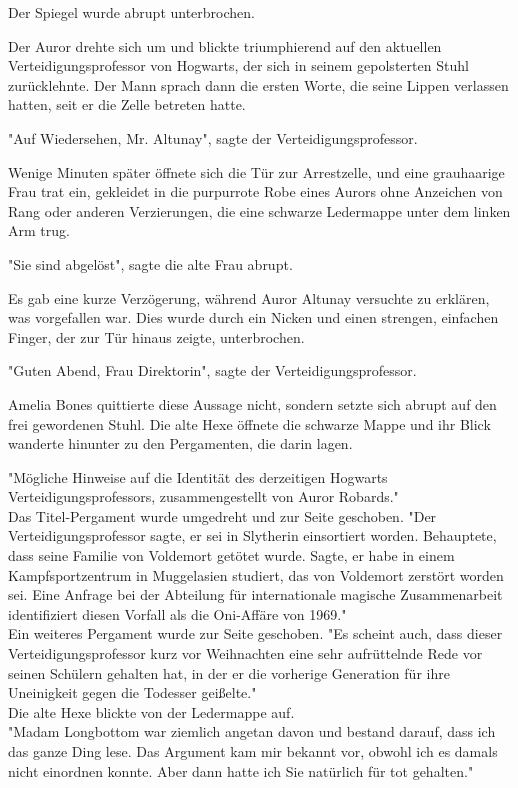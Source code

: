 {Der Spiegel wurde abrupt unterbrochen.

Der Auror drehte sich um und blickte triumphierend auf den aktuellen Verteidigungsprofessor von Hogwarts, der sich in seinem gepolsterten Stuhl zurücklehnte. Der Mann sprach dann die ersten Worte, die seine Lippen verlassen hatten, seit er die Zelle betreten hatte.

"Auf Wiedersehen, Mr. Altunay", sagte der Verteidigungsprofessor.

Wenige Minuten später öffnete sich die Tür zur Arrestzelle, und eine grauhaarige Frau trat ein, gekleidet in die purpurrote Robe eines Aurors ohne Anzeichen von Rang oder anderen Verzierungen, die eine schwarze Ledermappe unter dem linken Arm trug.

"Sie sind abgelöst", sagte die alte Frau abrupt.

Es gab eine kurze Verzögerung, während Auror Altunay versuchte zu erklären, was vorgefallen war. Dies wurde durch ein Nicken und einen strengen, einfachen Finger, der zur Tür hinaus zeigte, unterbrochen.

"Guten Abend, Frau Direktorin", sagte der Verteidigungsprofessor.

Amelia Bones quittierte diese Aussage nicht, sondern setzte sich abrupt auf den frei gewordenen Stuhl. Die alte Hexe öffnete die schwarze Mappe und ihr Blick wanderte hinunter zu den Pergamenten, die darin lagen.

"Mögliche Hinweise auf die Identität des derzeitigen Hogwarts Verteidigungsprofessors, zusammengestellt von Auror Robards."\\ Das Titel-Pergament wurde umgedreht und zur Seite geschoben. "Der Verteidigungsprofessor sagte, er sei in Slytherin einsortiert worden. Behauptete, dass seine Familie von Voldemort getötet wurde. Sagte, er habe in einem Kampfsportzentrum in Muggelasien studiert, das von Voldemort zerstört worden sei. Eine Anfrage bei der Abteilung für internationale magische Zusammenarbeit identifiziert diesen Vorfall als die Oni-Affäre von 1969."\\ Ein weiteres Pergament wurde zur Seite geschoben. "Es scheint auch, dass dieser Verteidigungsprofessor kurz vor Weihnachten eine sehr aufrüttelnde Rede vor seinen Schülern gehalten hat, in der er die vorherige Generation für ihre Uneinigkeit gegen die Todesser geißelte."\\ Die alte Hexe blickte von der Ledermappe auf.\\ "Madam Longbottom war ziemlich angetan davon und bestand darauf, dass ich das ganze Ding lese. Das Argument kam mir bekannt vor, obwohl ich es damals nicht einordnen konnte. Aber dann hatte ich Sie natürlich für tot gehalten."

}
